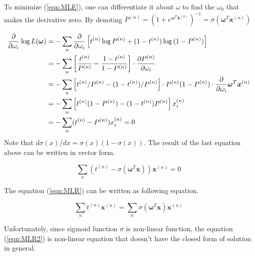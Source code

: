 \documentclass[12pt]{article}
\begin{document}
To minimize (\ref{eqn:MLE}), one can differentiate it about $\omega$ to find the $\omega_0$ that makes the derivative zero. By denoting $P^{(n)} = ({1+e^{\boldsymbol{\omega}^T \boldsymbol{x}^{(n)}}})^{-1} = \sigma(\boldsymbol{\omega}^T\boldsymbol{x}^{(n)})$


\begin{align*}
    {\partial \over \partial \omega_i}\log{L(\boldsymbol{\omega})} &= -\sum_n{\partial \over \partial \omega_i}\left[t^{(n)}\log{P^{(n)}} + (1-t^{(n)})\log{(1-P^{(n)})}\right] \\ &= - \sum_n\left[\frac{t^{(n)}}{{P^{(n)}}} - \frac{1-t^{(n)}}{1-P^{(n)}}\right]\cdot {\partial P^{(n)} \over \partial \omega_i} \\ &= -\sum_n\left[t^{(n)}/P^{(n)} - (1-t^{(n)})/P^{(n)}\right]\cdot P^{(n)}(1-P^{(n)})\cdot {\partial \over \partial \omega_i} \boldsymbol{\omega}^T\boldsymbol{x}^{(n)} \\ &= -\sum_n\left[t^{(n)}(1-P^{(n)}) - (1-t^{(n)})P^{(n)} \right]x_i^{(n)} \\ &= - \sum_n(t^{(n)} - P^{(n)})x_i^{(n)} = 0
\end{align*}
Note that ${d\sigma(x)/ dx} = \sigma(x)(1-\sigma(x))$.
The result of the last equation above can be written in vector form.

\begin{equation}
    \sum_n\left(t^{(n)} - \sigma(\boldsymbol{\omega}^T\boldsymbol{x})\right)\boldsymbol{x}^{(n)} = 0
    \label{eqn:MLR}
\end{equation}

The equation (\ref{eqn:MLR}) can be written as following equation.

\begin{equation}
    \sum_n t^{(n)}\boldsymbol{x}^{(n)} = \sum_n\sigma(\boldsymbol{\omega}^T\boldsymbol{x})\boldsymbol{x}^{(n)}
    \label{eqn:MLR2}
\end{equation}

Unfortunately, since sigmoid function $\sigma$ is non-linear function, the equation (\ref{eqn:MLR2}) is non-linear equation that doesn't have the closed form of solution in general.
\end{document}
